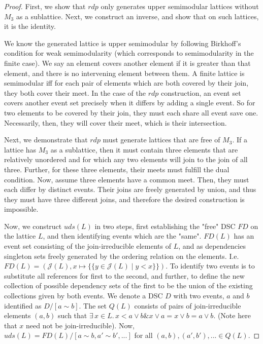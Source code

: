\documentclass[hoptionsi,review,format=acmsmall]{acmart}
\theoremstyle{definition}
\newcommand{\Jc}{\mathcal{J}}
\newcommand{\band}{\mathbin{\&}}
\begin{document}
\begin{proof}
First, we show that \(rdp\) only generates upper semimodular lattices without \(M_3\) as a sublattice. Next, we construct an inverse, and show that on such lattices, it is the identity.

We know the generated lattice is upper semimodular by following Birkhoff's condition for weak semimodularity (which corresponds to semimodularity in the finite case). We say an element covers another element if it is greater than that element, and there is no intervening element between them. A finite lattice is semimodular iff for each pair of elements which are both covered by their join, they both cover their meet. In the case of the \(rdp\) construction, an event set covers another event set precisely when it differs by adding a single event. So for two elements to be covered by their join, they must each share all event save one. Necessarily, then, they will cover their meet, which is their intersection.

Next, we demonstrate that \(rdp\) must generate lattices that are free of \(M_3\). If a lattice has \(M_3\) as a sublattice, then it must contain three elements that are relatively unordered and for which any two elements will join to the join of all three. Further, for these three elements, their meets must fulfill the dual condition. Now, assume three elements have a common meet. Then, they must each differ by distinct events.  Their joins are freely generated by union, and thus they must have three different joins, and therefore the desired construction is impossible.

Now, we construct \(uds(L)\) in two steps, first establishing the "free" DSC \(FD\) on the lattice \(L\), and then identifying events which are the "same". \(FD(L)\) has an event set consisting of the join-irreducible elements of \(L\), and as dependencies singleton sets freely generated by the ordering relation on the elements.  I.e. \(FD(L) = (\Jc(L), x \mapsto \{\{ y \in \Jc(L) \mid y<x\}\})\). To identify two events is to substitute all references for first to the second, and further, to define the new collection of possible dependency sets of the first to be the union of the existing collections given by both events. We denote a DSC \(D\) with two events, \(a\) and \(b\) identified as  \(D/[a\sim b]\). The set \(Q(L)\) consists of pairs of join-irreducible elements \((a,b)\) such that  \(\exists\, x \in L . \,  x < a \vee b \band x \vee a = x \vee b = a \vee b\). (Note here that \(x\) need not be join-irreducible). Now, \(uds(L) = FD(L)/[a \sim b,a' \sim b',...]\) for all \((a,b), (a',b'), ...\in Q(L)\).


\end{proof}
\end{document}
